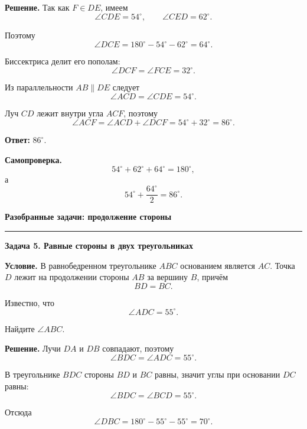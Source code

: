 \documentclass[a4paper,12pt]{article}
\newcommand{\Section}[1]{%
  \Needspace{5\baselineskip}%
  \vspace{0.6em}%
  {\Large\bfseries\color{darkaccent}#1}\par
  \vspace{0.2em}%
  {\color{accent}\rule{0.14\linewidth}{1.2pt}}\par
  \vspace{0.4em}%
}
\newcommand{\Subsection}[1]{%
  \Needspace{3\baselineskip}%
  \vspace{0.45em}%
  {\large\bfseries\color{darkaccent}#1}\par
  \vspace{0.15em}%
}
\newcommand{\Key}[1]{\textbf{\color{darkaccent}#1}}
\newcommand{\degree}{^{\circ}}
\begin{document}
\Key{Решение.}
Так как $F\in DE$, имеем
\[
  \angle CDE=54\degree,
  \qquad
  \angle CED=62\degree.
\]

Поэтому
\[
  \angle DCE
  =
  180\degree-54\degree-62\degree
  =
  64\degree.
\]

Биссектриса делит его пополам:
\[
  \angle DCF
  =
  \angle FCE
  =
  32\degree.
\]

Из параллельности $AB\parallel DE$ следует
\[
  \angle ACD=\angle CDE=54\degree.
\]

Луч $CD$ лежит внутри угла $ACF$, поэтому
\[
  \angle ACF
  =
  \angle ACD+\angle DCF
  =
  54\degree+32\degree
  =
  86\degree.
\]

\Key{Ответ:} $86\degree$.

\Key{Самопроверка.}
\[
  54\degree+62\degree+64\degree=180\degree,
\]
а
\[
  54\degree+\frac{64\degree}{2}=86\degree.
\]

\Section{Разобранные задачи: продолжение стороны}

\Subsection{Задача 5. Равные стороны в двух треугольниках}

\Key{Условие.}
В равнобедренном треугольнике $ABC$ основанием является $AC$.
Точка $D$ лежит на продолжении стороны $AB$ за вершину $B$, причём
\[
  BD=BC.
\]

Известно, что
\[
  \angle ADC=55\degree.
\]

Найдите $\angle ABC$.

\begin{center}
\end{center}

\Key{Решение.}
Лучи $DA$ и $DB$ совпадают, поэтому
\[
  \angle BDC=\angle ADC=55\degree.
\]

В треугольнике $BDC$ стороны $BD$ и $BC$ равны,
значит углы при основании $DC$ равны:
\[
  \angle BDC=\angle BCD=55\degree.
\]

Отсюда
\[
  \angle DBC
  =
  180\degree-55\degree-55\degree
  =
  70\degree.
\]
\end{document}
